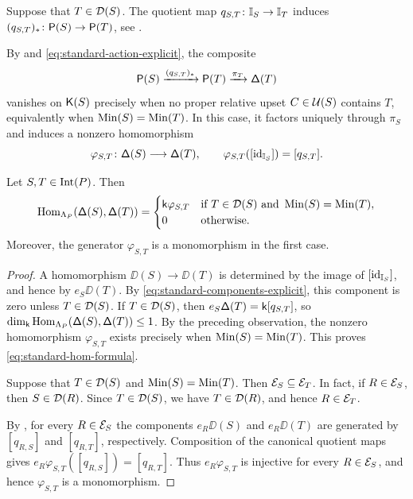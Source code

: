 Suppose that $T\in\mathcal D(S)$. 
The quotient map
$q_{S,T}\colon\mathbb I_S\to\mathbb I_T$ induces 
$(q_{S,T})_*\colon\mathsf P(S)\to\mathsf P(T)$, see .

By  and
\eqref{eq:standard-action-explicit}, the composite
\[
\mathsf P(S)
\xrightarrow{(q_{S,T})_*}
\mathsf P(T)
\xrightarrow{\pi_T}
\mathsf\Delta(T)
\]
vanishes on $\mathsf K(S)$ precisely when
no proper relative upset $C\in\mathcal U(S)$ contains $T$, equivalently when $\operatorname{Min}(S)=\operatorname{Min}(T)$.
In this case, it factors uniquely through $\pi_S$ and induces a
nonzero homomorphism
\begin{equation}
\varphi_{S,T}\colon\mathsf\Delta(S)\longrightarrow\mathsf\Delta(T),
\qquad
\varphi_{S,T}([\operatorname{id}_{\mathbb I_S}])=[q_{S,T}].
\label{eq:standard-Hom-generator}
\end{equation}

\begin{proposition}
\label{prop:standard-hom-formula}
Let $S,T\in\operatorname{Int}(P)$. Then
\begin{equation}
\operatorname{Hom}_{\Lambda_P}(\mathsf\Delta(S),\mathsf\Delta(T))
=
\begin{cases}
\mathsf{k}\varphi_{S,T}
& \text{if } T\in\mathcal D(S) \text{ and } \operatorname{Min}(S)=\operatorname{Min}(T),\\
0
& \text{otherwise}.
\end{cases}
\label{eq:standard-hom-formula}
\end{equation}
Moreover, the generator $\varphi_{S,T}$ is a monomorphism in the first case.
\end{proposition}


\begin{proof}
A homomorphism $\DD(S)\to\DD(T)$ is determined by the image of
$[\operatorname{id}_{\mathbb I_S}]$, and hence by $e_S\DD(T)$. By
\eqref{eq:standard-components-explicit}, this component is zero unless
$T\in\mathcal D(S)$. If $T\in\mathcal D(S)$, then
$e_S\mathsf\Delta(T)=\mathsf{k}[q_{S,T}]$, so
$\dim_{\mathsf{k}}\operatorname{Hom}_{\Lambda_P}(\mathsf\Delta(S),\mathsf\Delta(T))\leq1$.
By the preceding observation, the nonzero homomorphism
$\varphi_{S,T}$ exists precisely when
$\operatorname{Min}(S)=\operatorname{Min}(T)$. This proves
\eqref{eq:standard-hom-formula}.

Suppose that $T\in\mathcal D(S)$ and $\operatorname{Min}(S)=\operatorname{Min}(T)$.
Then $\mathcal E_S\subseteq\mathcal E_T$. In fact, if $R\in\mathcal E_S$, then
$S\in\mathcal D(R)$. Since $T\in\mathcal D(S)$, we have $T\in\mathcal D(R)$, and hence
$R\in\mathcal E_T$.

By , for every $R\in\mathcal E_S$ the
components $e_R\DD(S)$ and $e_R\DD(T)$ are generated by
$[q_{R,S}]$ and $[q_{R,T}]$, respectively. Composition of the canonical
quotient maps gives
$e_R\varphi_{S,T}([q_{R,S}])=[q_{R,T}]$.
Thus $e_R\varphi_{S,T}$ is injective for every $R\in\mathcal E_S$, and hence
$\varphi_{S,T}$ is a monomorphism.
\end{proof}


